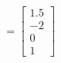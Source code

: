 \documentclass[preview]{standalone}
\begin{document}
\begin{center}
$ = \begin{bmatrix}1.5 \\ -2 \\ 0\\ 1\end{bmatrix}$
\end{center}
\end{document}
